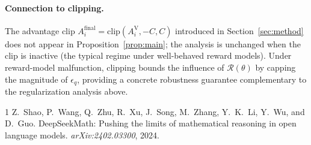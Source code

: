 \documentclass[10pt]{article}
\begin{document}
\paragraph{Connection to clipping.}
The advantage clip $A_i^{\text{final}} = \mathrm{clip}(A_i^{\text{V}}, -C, C)$
introduced in Section~\ref{sec:method} does not appear in
Proposition~\ref{prop:main}; the analysis is unchanged when the clip is
inactive (the typical regime under well-behaved reward models). Under
reward-model malfunction, clipping bounds the influence of $\mathcal{R}(\theta)$
by capping the magnitude of $\epsilon_q$, providing a concrete robustness
guarantee complementary to the regularization analysis above.

\begin{thebibliography}{1}
Z.~Shao, P.~Wang, Q.~Zhu, R.~Xu, J.~Song, M.~Zhang, Y.~K.~Li, Y.~Wu, and D.~Guo.
\newblock DeepSeekMath: Pushing the limits of mathematical reasoning in open
  language models.
\newblock \emph{arXiv:2402.03300}, 2024.
\end{thebibliography}
\end{document}
